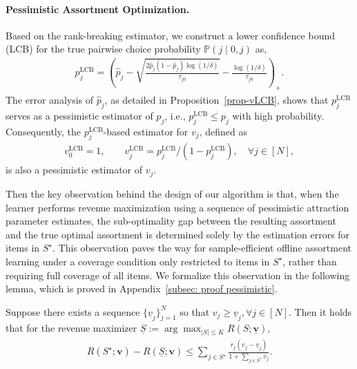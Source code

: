 \documentclass[10pt, letterpaper]{article}
\begin{document}
\paragraph{Pessimistic Assortment Optimization.}
Based on the rank-breaking estimator, we construct a lower confidence bound (LCB) for the true pairwise choice probability $\mathbb{P}(j \mid {0, j})$ as,
\begin{align*}
    p_j^{\text{LCB}} = \left(\widehat{p}_j - \sqrt{\frac{2\widehat{p}_j(1-\widehat{p}_j)\log(1/\delta)}{\tau_{j0}}} - \frac{\log(1/\delta)}{\tau_{j0}}\right)_+.
\end{align*}
The error analysis of $\widehat{p}_j$, as detailed in Proposition~\ref{prop-vLCB}, shows that $p_j^{\text{LCB}}$ serves as a pessimistic estimator of $p_j$, i.e., $p_j^{\text{LCB}} \leq p_j$ with high probability. Consequently, the $p_j^{\text{LCB}}$-based estimator for $v_j$, defined as
\begin{align*}
    v_0^{\mathrm{LCB}}=1,\qquad v_j^{\text{LCB}} = p_j^{\text{LCB}} / (1 - p_j^{\text{LCB}}),\quad\forall j\in[N],
\end{align*}
is also a pessimistic estimator of $v_j$. 

Then the key observation  behind the design of our algorithm is that, when the learner performs revenue maximization using a sequence of pessimistic attraction parameter estimates, the sub-optimality gap between the resulting assortment and the true optimal assortment is determined solely by the estimation errors for items in $S^\star$. 
This observation paves the way for sample-efficient offline assortment learning under a coverage condition only restricted to items in $S^\star$, rather than requiring full coverage of all items. 
We formalize this observation in the following lemma, which is proved in Appendix~\ref{subsec: proof pessimistic}.

\begin{lemma}\label{lem-SubOptGap-via-pessmistic}
    Suppose there exists a sequence $\{\underline{v}_j \}_{j = 1}^N$ so that $v_j \geq \underline{v}_j,\forall j \in [N].$ Then it holds that for the revenue maximizer $\underline{S}:= \arg\max_{\lvert S \rvert \leq K} R(S;\underline{\bm v}),$ 
    \begin{align*}
        R(S^\star;\bm v) - R(\underline{S};\bm v) \leq \sum_{j \in S^\star} \frac{r_j(v_j - \underline{v}_j)}{1+\sum_{j\in S^\star} v_j}.
    \end{align*}
\end{lemma}
\end{document}
